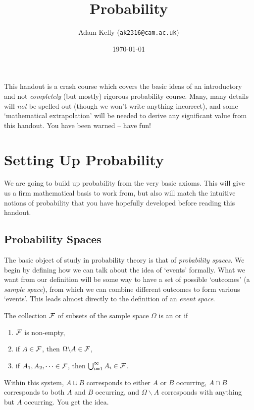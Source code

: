 \documentclass[a4paper]{scrartcl}
\title{Probability}
\author{Adam Kelly (\texttt{ak2316@cam.ac.uk})}
\date{\today}
\begin{document}
\maketitle


This handout is a crash course which covers the basic ideas of an introductory and not \emph{completely} (but mostly) rigorous probability course. 
Many, many details will \emph{not} be spelled out (though we won't write anything incorrect), and some `mathematical extrapolation' will be needed to derive any significant value from this handout. You have been warned -- have fun!

\tableofcontents

\section{Setting Up Probability}

We are going to build up probability from the very basic axioms. This will give us a firm mathematical basis to work from, but also will match the intuitive notions of probability that you have hopefully developed before reading this handout.

\subsection{Probability Spaces}

The basic object of study in probability theory is that of \emph{probability spaces}. We begin by defining how we can talk about the idea of `events' formally. What we want from our definition will be some way to have a set of possible `outcomes' (a \emph{sample space}), from which we can combine different outcomes to form various `events'. This leads almost directly to the definition of an \emph{event space}.

\begin{definition} The collection $\mathcal{F}$ of subsets of the sample space $\Omega$ is an  or  if
	\begin{enumerate}
		\item $\mathcal{F}$ is non-empty,
		\item if $A \in \mathcal{F}$, then $\Omega \backslash A \in \mathcal{F}$,
		\item if $A_1, A_2, \dots \in \mathcal{F}$, then $\bigcup_{i = 1}^{\infty} A_i \in \mathcal{F}$.
	\end{enumerate}
\end{definition}

Within this system, $A \cup B$ corresponds to either $A$ or $B$ occurring, $A \cap B$ corresponds to both $A$ and $B$ occurring, and $\Omega \backslash A$ corresponds with anything but $A$ occurring. You get the idea.
\end{document}
